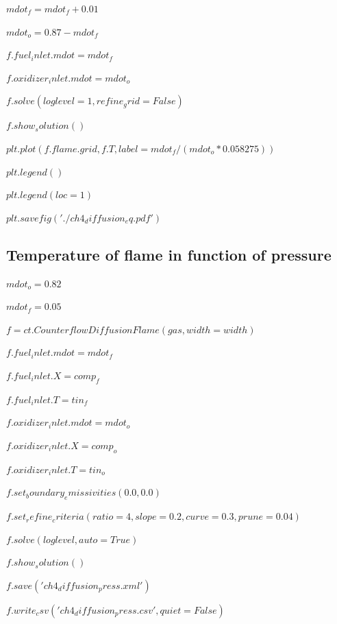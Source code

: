 \documentclass[a4paper]{article}
\begin{document}
\hspace{5,35mm}$    mdot_f=mdot_f+0.01$

\hspace{5,35mm}$    mdot_o = 0.87-mdot_f$

\hspace{5,35mm}$    f.fuel_inlet.mdot = mdot_f$

\hspace{5,35mm}$    f.oxidizer_inlet.mdot = mdot_o$

\hspace{5,35mm}$    f.solve(loglevel=1, refine_grid=False)$

\hspace{5,35mm}$    f.show_solution()$

\hspace{5,35mm}$    plt.plot(f.flame.grid, f.T, label=mdot_f/(mdot_o*0.058275))$

\hspace{5,35mm}$    plt.legend()$

\hspace{5,35mm}$    plt.legend(loc=1)$

$plt.savefig('./ch4_diffusion_eq.pdf')$

\subsection{Temperature of flame in function of pressure}

$mdot_o = 0.82$

$mdot_f = 0.05$

$f = ct.CounterflowDiffusionFlame(gas, width=width)$

$f.fuel_inlet.mdot = mdot_f$

$f.fuel_inlet.X = comp_f$

$f.fuel_inlet.T = tin_f$

$f.oxidizer_inlet.mdot = mdot_o$

$f.oxidizer_inlet.X = comp_o$

$f.oxidizer_inlet.T = tin_o$

$f.set_boundary_emissivities(0.0, 0.0)$

$f.set_refine_criteria(ratio=4, slope=0.2, curve=0.3, prune=0.04)$

$f.solve(loglevel, auto=True)$

$f.show_solution()$

$f.save('ch4_diffusion_press.xml')$

$f.write_csv('ch4_diffusion_press.csv', quiet=False)$
\end{document}
